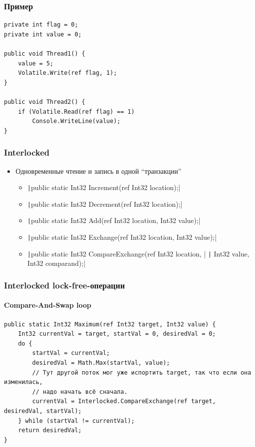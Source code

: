 \documentclass[xetex,mathserif,serif]{beamer}
\begin{document}
	\begin{frame}[fragile]
		\frametitle{Пример}
		\begin{verbatim}
private int flag = 0;
private int value = 0;

public void Thread1() {
    value = 5;
    Volatile.Write(ref flag, 1);
}

public void Thread2() {
    if (Volatile.Read(ref flag) == 1)
        Console.WriteLine(value);
}
		\end{verbatim}
	\end{frame}

	\begin{frame}
		\frametitle{Interlocked}
		\begin{itemize}
			\item Одновременные чтение и запись в одной ``транзакции''
			\begin{itemize}
				\item \texttt|public static Int32 Increment(ref Int32 location);|
				\item \texttt|public static Int32 Decrement(ref Int32 location);|
				\item \texttt|public static Int32 Add(ref Int32 location, Int32 value);|
				\item \texttt|public static Int32 Exchange(ref Int32 location, Int32 value);|
				\item \texttt|public static Int32 CompareExchange(ref Int32 location, |
					\texttt| Int32 value, Int32 comparand);|
			\end{itemize}
		\end{itemize}
	\end{frame}

	\begin{frame}[fragile]
		\frametitle{Interlocked lock-free-операции}
		\framesubtitle{Compare-And-Swap loop}
		\begin{footnotesize}
			\begin{verbatim}
public static Int32 Maximum(ref Int32 target, Int32 value) {
    Int32 currentVal = target, startVal = 0, desiredVal = 0;
    do {
        startVal = currentVal;
        desiredVal = Math.Max(startVal, value);
        // Тут другой поток мог уже испортить target, так что если она изменилась,
        // надо начать всё сначала.
        currentVal = Interlocked.CompareExchange(ref target, desiredVal, startVal);
    } while (startVal != currentVal);
    return desiredVal;
}
			\end{verbatim}
		\end{footnotesize}
	\end{frame}
\end{document}
